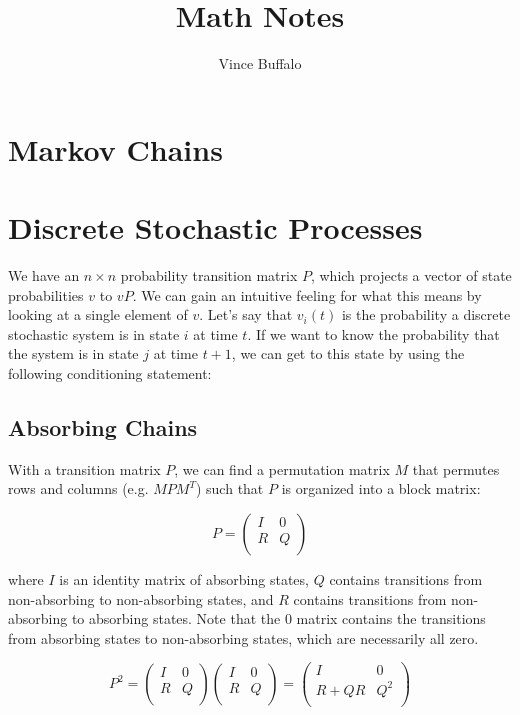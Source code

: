 \documentclass[11pt]{article}
\title{Math Notes}
\author{Vince Buffalo}
\begin{document}
\maketitle

\section{Markov Chains}


\section{Discrete Stochastic Processes}

We have an $n \times n$ probability transition matrix $P$, which projects a
vector of state probabilities $v$ to $vP$. We can gain an intuitive feeling for
what this means by looking at a single element of $v$. Let's say that $v_i(t)$
is the probability a discrete stochastic system is in state $i$ at time $t$. If
we want to know the probability that the system is in state $j$ at time $t +
1$, we can get to this state by using the following conditioning statement:


\subsection{Absorbing Chains}

With a transition matrix $P$, we can find a permutation matrix $M$ that
permutes rows and columns (e.g. $M P M^T$) such that $P$ is organized into a
block matrix:

$$
P = \begin{pmatrix}
  I & 0 \\
  R & Q \\
\end{pmatrix}
$$

where $I$ is an identity matrix of absorbing states, $Q$ contains transitions
from non-absorbing to non-absorbing states, and $R$ contains transitions from
non-absorbing to absorbing states. Note that the $0$ matrix contains the
transitions from absorbing states to non-absorbing states, which are
necessarily all zero.

$$
P^2 = \begin{pmatrix}
  I & 0 \\
  R & Q \\
\end{pmatrix}
\begin{pmatrix}
  I & 0 \\
  R & Q \\
\end{pmatrix} = 
\begin{pmatrix}
  I & 0 \\
  R + QR & Q^2\\
\end{pmatrix}
$$
\end{document}
